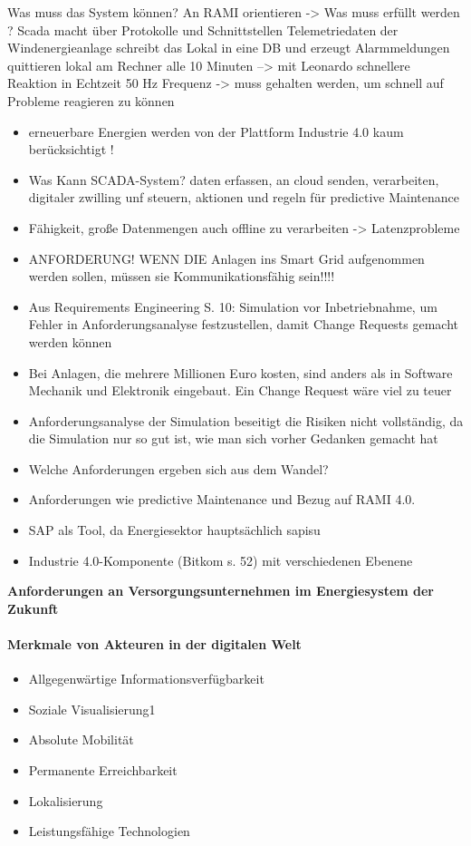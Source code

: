 Was muss das System können? An RAMI orientieren -> Was muss erfüllt werden ?
Scada macht über Protokolle und Schnittstellen Telemetriedaten der Windenergieanlage
schreibt das Lokal in eine DB und erzeugt Alarmmeldungen
quittieren lokal am Rechner
alle 10 Minuten --> mit Leonardo schnellere Reaktion in Echtzeit
50 Hz Frequenz -> muss gehalten werden, um schnell auf Probleme reagieren zu können


\begin{itemize}
  \item erneuerbare Energien werden von der Plattform Industrie 4.0 kaum berücksichtigt !
  \item Was Kann SCADA-System? daten erfassen, an cloud senden, verarbeiten, digitaler zwilling unf steuern, aktionen und regeln für predictive Maintenance
  \item Fähigkeit, große Datenmengen auch offline zu verarbeiten -> Latenzprobleme
  \item ANFORDERUNG! WENN DIE Anlagen ins Smart Grid aufgenommen werden sollen, müssen sie Kommunikationsfähig sein!!!!
  \item Aus Requirements Engineering S. 10: Simulation vor Inbetriebnahme, um Fehler in Anforderungsanalyse festzustellen, damit Change Requests gemacht werden können
  \item Bei Anlagen, die mehrere Millionen Euro kosten, sind anders als in Software Mechanik und Elektronik eingebaut. Ein Change Request wäre viel zu teuer
  \item Anforderungsanalyse der Simulation beseitigt die Risiken nicht vollständig, da die Simulation nur so gut ist, wie man sich vorher Gedanken gemacht hat
  \item Welche Anforderungen ergeben sich aus dem Wandel?
  \item Anforderungen wie predictive Maintenance und Bezug auf RAMI 4.0.
  \item SAP als Tool, da Energiesektor hauptsächlich \acf{sapisu}
  \item Industrie 4.0-Komponente (Bitkom s. 52) mit verschiedenen Ebenene
\end{itemize}

\textbf{Anforderungen an Versorgungsunternehmen im Energiesystem der Zukunft \citep[S. 19]{Doleski2016}}

\paragraph{Merkmale von Akteuren in der digitalen Welt}
\begin{itemize}
  \item Allgegenwärtige Informationsverfügbarkeit
  \item Soziale Visualisierung1
  \item Absolute Mobilität
  \item Permanente Erreichbarkeit
  \item Lokalisierung
  \item Leistungsfähige Technologien
\end{itemize}

